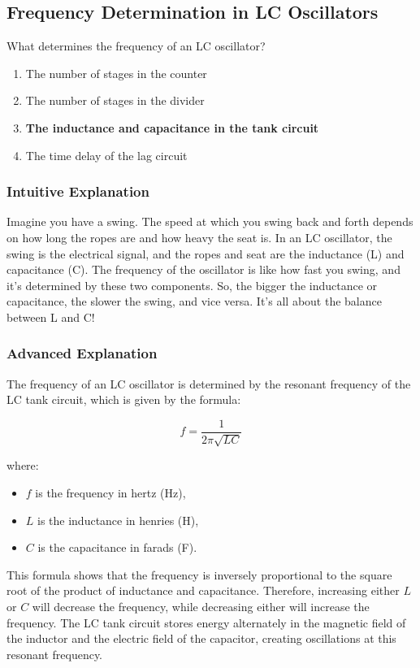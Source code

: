 \subsection{Frequency Determination in LC Oscillators}
\label{G7B09}

\begin{tcolorbox}[colback=gray!10!white,colframe=black!75!black,title=G7B09]
What determines the frequency of an LC oscillator?
\begin{enumerate}[label=\Alph*.]
    \item The number of stages in the counter
    \item The number of stages in the divider
    \item \textbf{The inductance and capacitance in the tank circuit}
    \item The time delay of the lag circuit
\end{enumerate}
\end{tcolorbox}

\subsubsection{Intuitive Explanation}
Imagine you have a swing. The speed at which you swing back and forth depends on how long the ropes are and how heavy the seat is. In an LC oscillator, the swing is the electrical signal, and the ropes and seat are the inductance (L) and capacitance (C). The frequency of the oscillator is like how fast you swing, and it’s determined by these two components. So, the bigger the inductance or capacitance, the slower the swing, and vice versa. It’s all about the balance between L and C!

\subsubsection{Advanced Explanation}
The frequency of an LC oscillator is determined by the resonant frequency of the LC tank circuit, which is given by the formula:

\[
f = \frac{1}{2\pi\sqrt{LC}}
\]

where:
\begin{itemize}
    \item \( f \) is the frequency in hertz (Hz),
    \item \( L \) is the inductance in henries (H),
    \item \( C \) is the capacitance in farads (F).
\end{itemize}

This formula shows that the frequency is inversely proportional to the square root of the product of inductance and capacitance. Therefore, increasing either \( L \) or \( C \) will decrease the frequency, while decreasing either will increase the frequency. The LC tank circuit stores energy alternately in the magnetic field of the inductor and the electric field of the capacitor, creating oscillations at this resonant frequency.

